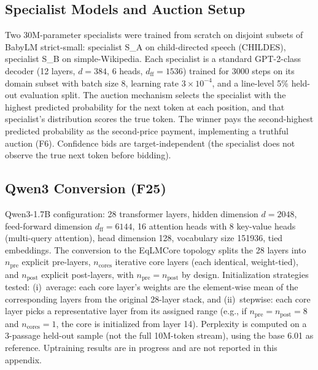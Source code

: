 \subsection{Specialist Models and Auction Setup}

Two 30M-parameter specialists were trained from scratch on disjoint subsets of BabyLM strict-small: specialist S\_A on child-directed speech (CHILDES), specialist S\_B on simple-Wikipedia. Each specialist is a standard GPT-2-class decoder (12 layers, $d=384$, 6 heads, $d_{\text{ff}}=1536$) trained for 3000 steps on its domain subset with batch size 8, learning rate $3 \times 10^{-4}$, and a line-level 5\% held-out evaluation split. The auction mechanism selects the specialist with the highest predicted probability for the next token at each position, and that specialist's distribution scores the true token. The winner pays the second-highest predicted probability as the second-price payment, implementing a truthful auction (F6). Confidence bids are target-independent (the specialist does not observe the true next token before bidding).

\subsection{Qwen3 Conversion (F25)}

Qwen3-1.7B configuration: 28 transformer layers, hidden dimension $d=2048$, feed-forward dimension $d_{\text{ff}}=6144$, 16 attention heads with 8 key-value heads (multi-query attention), head dimension 128, vocabulary size 151936, tied embeddings. The conversion to the EqLMCore topology splits the 28 layers into $n_{\mathrm{pre}}$ explicit pre-layers, $n_{\mathrm{cores}}$ iterative core layers (each identical, weight-tied), and $n_{\mathrm{post}}$ explicit post-layers, with $n_{\mathrm{pre}} = n_{\mathrm{post}}$ by design. Initialization strategies tested: (i)~average: each core layer's weights are the element-wise mean of the corresponding layers from the original 28-layer stack, and (ii)~stepwise: each core layer picks a representative layer from its assigned range (e.g., if $n_{\mathrm{pre}} = n_{\mathrm{post}} = 8$ and $n_{\mathrm{cores}} = 1$, the core is initialized from layer 14). Perplexity is computed on a 3-passage held-out sample (not the full 10M-token stream), using the base 6.01 as reference. Uptraining results are in progress and are not reported in this appendix.

